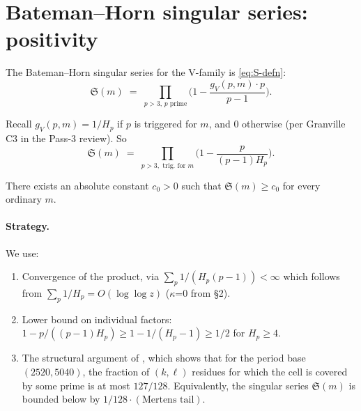 %

\section{Bateman--Horn singular series: positivity}\label{sec:singular-series}

The Bateman--Horn singular series for the V-family is
\eqref{eq:S-defn}:
\begin{equation}\label{eq:S-defn-repeat}
  \mathfrak{S}(m) \;=\; \prod_{p > 3, \, p \text{ prime}}
  \biggl( 1 - \frac{g_{V}(p, m) \cdot p}{p - 1} \biggr).
\end{equation}

Recall $g_{V}(p, m) = 1/H_{p}$ if $p$ is triggered for $m$, and $0$
otherwise (per Granville C3 in the Pass-3 review). So
\begin{equation}\label{eq:S-trig}
  \mathfrak{S}(m) \;=\; \prod_{p > 3, \text{ trig.\ for } m}
    \biggl( 1 - \frac{p}{(p-1) H_{p}} \biggr).
\end{equation}

\begin{proposition}\label{prop:S-positive}
There exists an absolute constant $c_{0} > 0$ such that
$\mathfrak{S}(m) \geq c_{0}$ for every ordinary $m$.
\end{proposition}

\paragraph{Strategy.}
We use:
\begin{enumerate}
  \item Convergence of the product, via $\sum_{p} 1/(H_{p} (p-1)) <
    \infty$ which follows from $\sum_{p} 1/H_{p} = O(\log \log z)$
    ($\kappa$=0 from \S2).
  \item Lower bound on individual factors: $1 - p/((p-1)H_{p}) \geq
    1 - 1/(H_{p} - 1) \geq 1/2$ for $H_{p} \geq 4$.
  \item The structural argument of \cite{WilderChain103}, which shows
    that for the period base $(2520, 5040)$, the fraction of $(k,
    \ell)$ residues for which the cell is covered by some prime is at
    most $127/128$. Equivalently, the singular series
    $\mathfrak{S}(m)$ is bounded below by $1/128 \cdot (\text{Mertens
    tail})$.
\end{enumerate}

